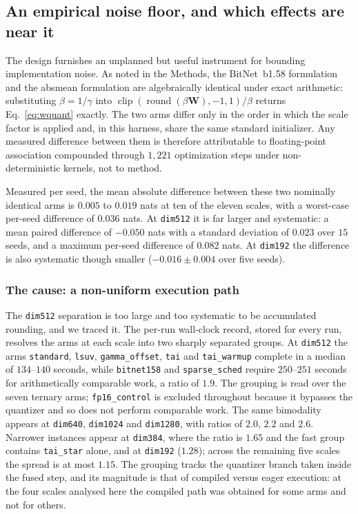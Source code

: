 \documentclass[final,5p,times,twocolumn]{elsarticle}
\theoremstyle{remark}
\newcommand{\Wm}{\mathbf{W}}
\newcommand{\clip}{\operatorname{clip}}
\newcommand{\round}{\operatorname{round}}
\begin{document}
\subsection{An empirical noise floor, and which effects are near it}
\label{sec:disc-noise}

The design furnishes an unplanned but useful instrument for bounding
implementation noise. As noted in the Methods, the BitNet~b1.58 formulation and
the absmean formulation are algebraically identical under exact arithmetic:
substituting $\beta = 1/\gamma$ into
$\clip(\round(\beta\Wm), -1, 1)/\beta$ returns Eq.~\eqref{eq:wquant} exactly.
The two arms differ only in the order in which the scale factor is applied and,
in this harness, share the same standard initializer. Any measured difference
between them is therefore attributable to floating-point association compounded
through $1{,}221$ optimization steps under non-deterministic kernels, not to
method.

Measured per seed, the mean absolute difference between these two nominally
identical arms is $0.005$ to $0.019$ nats at ten of the eleven scales, with a
worst-case per-seed difference of $0.036$ nats. At \texttt{dim512} it is far
larger and systematic: a mean paired difference of $-0.050$ nats with a
standard deviation of $0.023$ over $15$ seeds, and a maximum per-seed
difference of $0.082$ nats. At \texttt{dim192} the difference is also
systematic though smaller ($-0.016 \pm 0.004$ over five seeds).

\subsubsection{The cause: a non-uniform execution path}

The \texttt{dim512} separation is too large and too systematic to be
accumulated rounding, and we traced it. The per-run wall-clock record, stored
for every run, resolves the arms at each scale into two sharply separated
groups. At \texttt{dim512} the arms \texttt{standard}, \texttt{lsuv},
\texttt{gamma\_offset}, \texttt{tai} and \texttt{tai\_warmup} complete in a
median of $134$--$140$ seconds, while \texttt{bitnet158} and
\texttt{sparse\_sched} require $250$--$251$ seconds for arithmetically
comparable work, a ratio of $1.9$. The grouping is read over the seven ternary
arms; \texttt{fp16\_control} is excluded throughout because it bypasses the
quantizer and so does not perform comparable work. The same bimodality appears at
\texttt{dim640}, \texttt{dim1024} and \texttt{dim1280}, with ratios of $2.0$,
$2.2$ and $2.6$. Narrower instances appear at \texttt{dim384}, where the ratio
is $1.65$ and the fast group contains \texttt{tai\_star} alone, and at
\texttt{dim192} ($1.28$); across the remaining five scales the spread is at
most $1.15$. The grouping tracks the quantizer branch taken
inside the fused step, and its magnitude is that of compiled versus eager
execution: at the four scales analysed here the compiled path was obtained for
some arms and not for others.
\end{document}
